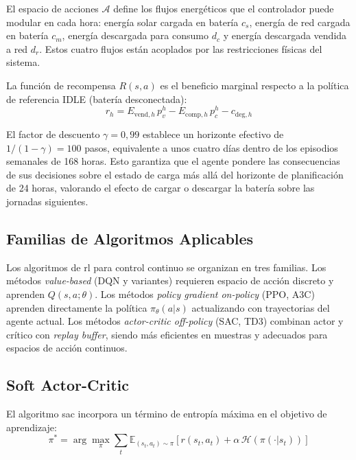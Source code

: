 \documentclass[12pt, a4paper, twoside]{report}
\begin{document}
El espacio de acciones $\mathcal{A}$ define los flujos energéticos que el
controlador puede modular en cada hora: energía solar cargada en batería $c_s$,
energía de red cargada en batería $c_m$, energía descargada para consumo $d_c$
y energía descargada vendida a red $d_r$. Estos cuatro flujos están acoplados
por las restricciones físicas del sistema.

La función de recompensa $R(s,a)$ es el beneficio marginal respecto a la
política de referencia IDLE (batería desconectada):
\begin{equation}
  r_h = E_{\text{vend},h}\,p_v^h - E_{\text{comp},h}\,p_c^h - c_{\text{deg},h}
  \label{eq:recompensa}
\end{equation}

El factor de descuento $\gamma = 0{,}99$ establece un horizonte efectivo de
$1/(1-\gamma) = 100$ pasos, equivalente a unos cuatro días dentro de los
episodios semanales de 168 horas. Esto garantiza que el agente pondere las
consecuencias de sus decisiones sobre el estado de carga más allá del horizonte
de planificación de 24 horas, valorando el efecto de cargar o descargar la
batería sobre las jornadas siguientes.

\subsection{Familias de Algoritmos Aplicables}

Los algoritmos de \acrshort{rl} para control continuo se organizan en tres
familias. Los métodos \textit{value-based} (DQN y variantes) requieren espacio
de acción discreto y aprenden $Q(s,a;\theta)$. Los métodos
\textit{policy gradient on-policy} (PPO, A3C) aprenden directamente la política
$\pi_\theta(a|s)$ actualizando con trayectorias del agente actual. Los métodos
\textit{actor-critic off-policy} (SAC, TD3) combinan actor y crítico con
\textit{replay buffer}, siendo más eficientes en muestras y adecuados para
espacios de acción continuos.

\subsection{Soft Actor-Critic}

El algoritmo \acrfull{sac} \citep{Haarnoja2018} incorpora un término de entropía
máxima en el objetivo de aprendizaje:
\begin{equation}
  \pi^* = \arg\max_\pi \sum_t \mathbb{E}_{(s_t,a_t)\sim\pi}\!\left[
    r(s_t,a_t) + \alpha\,\mathcal{H}(\pi(\cdot|s_t))
  \right]
  \label{eq:sac_objetivo}
\end{equation}
\end{document}
